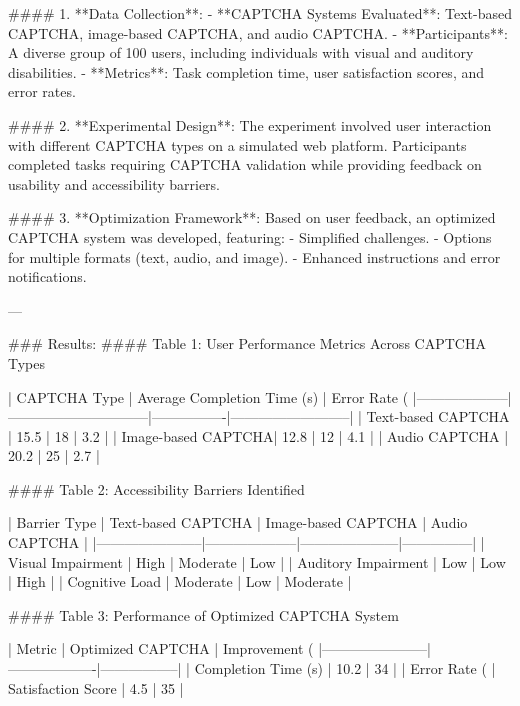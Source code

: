 #### 1. **Data Collection**:
- **CAPTCHA Systems Evaluated**: Text-based CAPTCHA, image-based CAPTCHA, and audio CAPTCHA.
- **Participants**: A diverse group of 100 users, including individuals with visual and auditory disabilities.
- **Metrics**: Task completion time, user satisfaction scores, and error rates.

#### 2. **Experimental Design**:
The experiment involved user interaction with different CAPTCHA types on a simulated web platform. Participants completed tasks requiring CAPTCHA validation while providing feedback on usability and accessibility barriers.

#### 3. **Optimization Framework**:
Based on user feedback, an optimized CAPTCHA system was developed, featuring:
- Simplified challenges.
- Options for multiple formats (text, audio, and image).
- Enhanced instructions and error notifications.

---

### Results:
#### Table 1: User Performance Metrics Across CAPTCHA Types

| CAPTCHA Type       | Average Completion Time (s) | Error Rate (%
|--------------------|------------------------------|----------------|--------------------------|
| Text-based CAPTCHA | 15.5                        | 18             | 3.2                      |
| Image-based CAPTCHA| 12.8                        | 12             | 4.1                      |
| Audio CAPTCHA      | 20.2                        | 25             | 2.7                      |

#### Table 2: Accessibility Barriers Identified

| Barrier Type          | Text-based CAPTCHA | Image-based CAPTCHA | Audio CAPTCHA |
|-----------------------|--------------------|---------------------|---------------|
| Visual Impairment     | High              | Moderate            | Low           |
| Auditory Impairment   | Low               | Low                 | High          |
| Cognitive Load        | Moderate          | Low                 | Moderate      |

#### Table 3: Performance of Optimized CAPTCHA System

| Metric                | Optimized CAPTCHA | Improvement (%
|-----------------------|-------------------|-----------------|
| Completion Time (s)   | 10.2             | 34              |
| Error Rate (%
| Satisfaction Score    | 4.5              | 35              |

